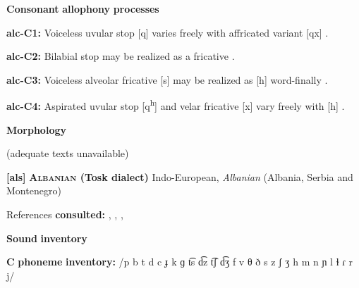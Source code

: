 \begin{styleBody}
\textbf{Consonant} \textbf{allophony} \textbf{processes}
\end{styleBody}

\begin{styleBody}
\textbf{alc-C1:} Voiceless uvular stop [q] varies freely with affricated variant [qx] \citep[378]{Clairis1985}.
\end{styleBody}

\begin{styleBody}
\textbf{alc-C2:}  Bilabial stop may be realized as a fricative \citep{Aguilera2001}.
\end{styleBody}

\begin{styleBody}
\textbf{alc-C3:} Voiceless alveolar fricative [s] may be realized as [h] word-finally \citep[372]{Clairis1985}.
\end{styleBody}

\begin{styleBody}
\textbf{alc-C4:} Aspirated uvular stop [q\textsuperscript{h}] and velar fricative [x] vary freely with [h] \citep[377-8]{Clairis1985}.
\end{styleBody}

\begin{styleBody}
\textbf{Morphology}
\end{styleBody}

\begin{styleBody}
(adequate texts unavailable)
\end{styleBody}

\begin{styleBody}
\textbf{[als]}   \textbf{\textsc{Albanian} \textbf{(Tosk} \textbf{dialect)}}  Indo-European, \textit{Albanian} (Albania, Serbia and Montenegro)
\end{styleBody}

\begin{styleBody}
References \textbf{consulted:} \citet{Bevington1974}, \citet{Klippenstein2010}, \citet{Newmark1957}, \citet{NewmarkEtAl1982}
\end{styleBody}

\begin{styleBody}
\textbf{Sound} \textbf{inventory}
\end{styleBody}

\begin{styleBody}
\textbf{C} \textbf{phoneme} \textbf{inventory:} /p b t d c ɟ k ɡ t͡s d͡z t͡ʃ d͡ʒ f v θ ð s z ʃ ʒ h m n ɲ l ɫ ɾ r j/
\end{styleBody}

